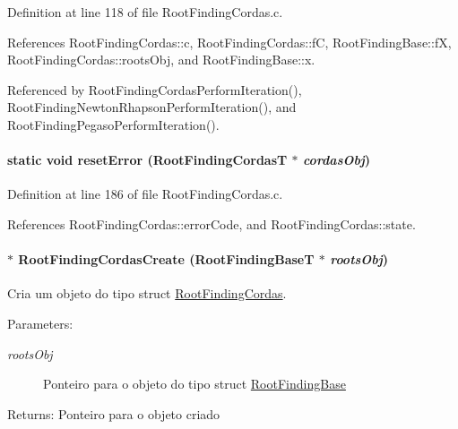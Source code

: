 Definition at line 118 of file RootFindingCordas.c.

References RootFindingCordas::c, RootFindingCordas::fC, RootFindingBase::fX, RootFindingCordas::rootsObj, and RootFindingBase::x.

Referenced by RootFindingCordasPerformIteration(), RootFindingNewtonRhapsonPerformIteration(), and RootFindingPegasoPerformIteration().\hypertarget{group____cordas_g69e02d4b63567d2bdde44b532d13fcbf}{
\paragraph[resetError]{\setlength{\rightskip}{0pt plus 5cm}static void resetError ({\bf RootFindingCordasT} $\ast$ {\em cordasObj})}\hfill}
\label{group____cordas_g69e02d4b63567d2bdde44b532d13fcbf}




Definition at line 186 of file RootFindingCordas.c.

References RootFindingCordas::errorCode, and RootFindingCordas::state.\hypertarget{group____cordas_g8e5327982ea6071bc6215f950d808bef}{
\paragraph[RootFindingCordasCreate]{$\ast$ RootFindingCordasCreate ({\bf RootFindingBaseT} $\ast$ {\em rootsObj})}\hfill}
\label{group____cordas_g8e5327982ea6071bc6215f950d808bef}


Cria um objeto do tipo struct \hyperlink{structRootFindingCordas}{RootFindingCordas}. 

\begin{Desc}
\item[Parameters:]
\begin{description}
\item[{\em rootsObj}]Ponteiro para o objeto do tipo struct \hyperlink{structRootFindingBase}{RootFindingBase} \end{description}
\end{Desc}
\begin{Desc}
\item[Returns:]Ponteiro para o objeto criado \end{Desc}


